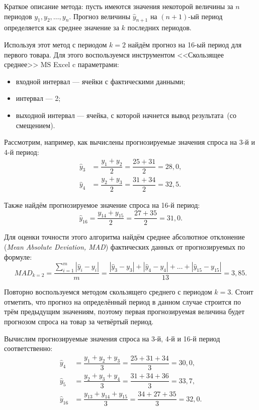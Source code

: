 Краткое описание метода: пусть имеются значения некоторой
величины за $n$ периодов $y_1, y_2, \dots, y_n$.
Прогноз величины $\hat{y}_{n+1}$ на $(n+1)\text{-ый}$ период определяется как
среднее значение за $k$ последних периодов.

Используя этот метод с периодом $k=2$ найдём прогноз на 16-ый период
для первого товара. Для этого воспользуемся инструментом
<<Скользящее среднее>> MS Excel c параметрами:
\begin{itemize}
  \item входной интервал --- ячейки с фактическими данными;
  \item интервал --- 2;
  \item выходной интервал --- ячейка, с которой начнется вывод результата~(со смещением).
\end{itemize}


Рассмотрим, например, как вычислены прогнозируемые значения спроса на 3-й и 4-й период:
\begin{align*}
  \hat{y}_3 &= \dfrac{y_1 + y_2}{2} = \dfrac{25 + 31}{2} = 28{,}0, \\
  \hat{y}_4 &= \dfrac{y_2 + y_3}{2} = \dfrac{31 + 34}{2} = 32{,}5.
\end{align*}

Также найдём прогнозируемое значение спроса на 16-й период:
\begin{equation*}
  \hat{y}_{16} = \dfrac{y_{14} + y_{15}}{2} = \dfrac{27 + 35}{2} = 31{,}0.
\end{equation*}

Для оценки точности этого алгоритма найдём среднее абсолютное отклонение
(\textit{Mean Absolute Deviation, MAD}) фактических данных от прогнозируемых по формуле:
\[
  MAD_{k=2} = \dfrac{\sum_{i=1}^{m} |\hat{y}_i - y_i| }{m} = \dfrac{|\hat{y}_3 - y_3| + |\hat{y}_4 - y_4| + \dots + |\hat{y}_{15} - y_{15}|}{13} = 3{,}85.
\]

Повторно воспользуемся методом скользящего среднего с периодом $k=3$.
Стоит отметить, что прогноз на определённый период в данном случае строится
по трём предыдущим значениям, поэтому первая прогнозируемая величина будет
прогнозом спроса на товар за четвёртый период.

Вычислим прогнозируемые значения спроса на 3-й, 4-й и 16-й период соответственно:
\begin{align*}
  \hat{y}_4 &= \dfrac{y_1 + y_2 + y_3}{3} = \dfrac{25 + 31 + 34}{3} = 30{,}0, \\
  \hat{y}_5 &= \dfrac{y_2 + y_3 + y_4}{3} = \dfrac{31 + 34 + 36}{3} = 33{,}7, \\
  \hat{y}_{16} &= \dfrac{y_{13} + y_{14} + y_{15}}{3} = \dfrac{34 + 27 + 35}{3} = 32{,}0.
\end{align*}

